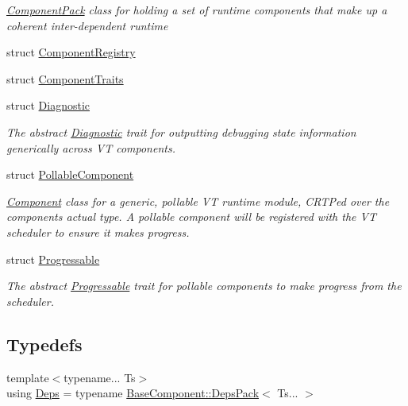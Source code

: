 \begin{DoxyCompactItemize}
\begin{DoxyCompactList}\small\item\em {\ttfamily \hyperlink{structvt_1_1runtime_1_1component_1_1_component_pack}{Component\+Pack}} class for holding a set of runtime components that make up a coherent inter-\/dependent runtime \end{DoxyCompactList}\item 
struct \hyperlink{structvt_1_1runtime_1_1component_1_1_component_registry}{Component\+Registry}
\item 
struct \hyperlink{structvt_1_1runtime_1_1component_1_1_component_traits}{Component\+Traits}
\item 
struct \hyperlink{structvt_1_1runtime_1_1component_1_1_diagnostic}{Diagnostic}
\begin{DoxyCompactList}\small\item\em The abstract {\ttfamily \hyperlink{structvt_1_1runtime_1_1component_1_1_diagnostic}{Diagnostic}} trait for outputting debugging state information generically across VT components. \end{DoxyCompactList}\item 
struct \hyperlink{structvt_1_1runtime_1_1component_1_1_pollable_component}{Pollable\+Component}
\begin{DoxyCompactList}\small\item\em {\ttfamily \hyperlink{structvt_1_1runtime_1_1component_1_1_component}{Component}} class for a generic, pollable VT runtime module, C\+R\+TP\textquotesingle{}ed over the component\textquotesingle{}s actual type. A pollable component will be registered with the VT scheduler to ensure it makes progress. \end{DoxyCompactList}\item 
struct \hyperlink{structvt_1_1runtime_1_1component_1_1_progressable}{Progressable}
\begin{DoxyCompactList}\small\item\em The abstract {\ttfamily \hyperlink{structvt_1_1runtime_1_1component_1_1_progressable}{Progressable}} trait for pollable components to make progress from the scheduler. \end{DoxyCompactList}\end{DoxyCompactItemize}
\subsection*{Typedefs}
\begin{DoxyCompactItemize}
\item 
{\footnotesize template$<$typename... Ts$>$ }\\using \hyperlink{namespacevt_1_1runtime_1_1component_afad3a7a92e35d9ab3d81540d9275213c}{Deps} = typename \hyperlink{structvt_1_1runtime_1_1component_1_1_base_component_1_1_deps_pack}{Base\+Component\+::\+Deps\+Pack}$<$ Ts... $>$
\end{DoxyCompactItemize}


